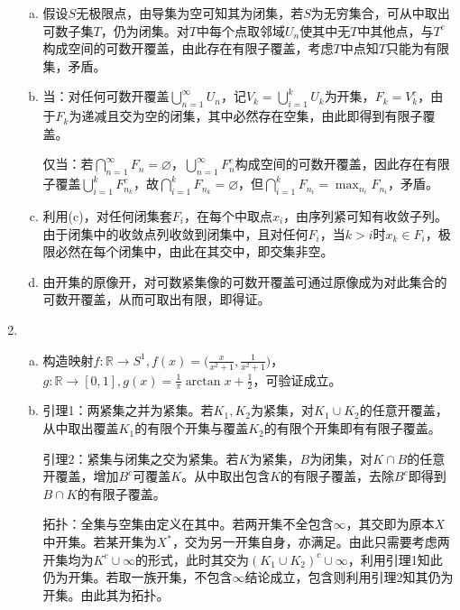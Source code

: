 \documentclass[a4paper,UTF8,fontset=windows]{ctexart}
\begin{document}
\begin{enumerate}[(1)]
\begin{enumerate}[(a)]
    \item
    假设$S$无极限点，由导集为空可知其为闭集，若$S$为无穷集合，可从中取出可数子集$T$，仍为闭集。对$T$中每个点取邻域$U_n$使其中无$T$中其他点，与$T^c$构成空间的可数开覆盖，由此存在有限子覆盖，考虑$T$中点知$T$只能为有限集，矛盾。
    
    \item
    当：对任何可数开覆盖$\bigcup_{n=1}^\infty U_n$，记$V_k=\bigcup_{i=1}^kU_k$为开集，$F_k=V_k^c$，由于$F_k$为递减且交为空的闭集，其中必然存在空集，由此即得到有限子覆盖。
    
    仅当：若$\bigcap_{n=1}^\infty F_n=\varnothing$，$\bigcup_{n=1}^\infty F_n^c$构成空间的可数开覆盖，因此存在有限子覆盖$\bigcup_{i=1}^kF_{n_k}^c$，故$\bigcap_{i=1}^kF_{n_k}=\varnothing$，但$\bigcap_{i=1}^kF_{n_i}=\max_{n_i}F_{n_i}$，矛盾。
    
    \item
    利用(c)，对任何闭集套$F_i$，在每个中取点$x_i$，由序列紧可知有收敛子列。由于闭集中的收敛点列收敛到闭集中，且对任何$F_i$，当$k>i$时$x_k\in F_i$，极限必然在每个闭集中，由此在其交中，即交集非空。
    
    \item
    由开集的原像开，对可数紧集像的可数开覆盖可通过原像成为对此集合的可数开覆盖，从而可取出有限，即得证。
    \end{enumerate}
    
    \item
    \begin{enumerate}[(a)]
    \item
    构造映射$f:\mathbb{R}\to S^1,f(x)=\big(\frac{x}{x^2+1},\frac{1}{x^2+1}\big)$，$g:\mathbb{R}\to[0,1],g(x)=\frac{1}{\pi}\arctan{x}+\frac{1}{2}$，可验证成立。
    
    \item
    引理1：两紧集之并为紧集。若$K_1,K_2$为紧集，对$K_1\cup K_2$的任意开覆盖，从中取出覆盖$K_1$的有限个开集与覆盖$K_2$的有限个开集即有有限子覆盖。
    
    引理2：紧集与闭集之交为紧集。若$K$为紧集，$B$为闭集，对$K\cap B$的任意开覆盖，增加$B^c$可覆盖$K$。从中取出包含$K$的有限子覆盖，去除$B^c$即得到$B\cap K$的有限子覆盖。
    
    拓扑：全集与空集由定义在其中。若两开集不全包含$\infty$，其交即为原本$X$中开集。若某开集为$X^*$，交为另一开集自身，亦满足。由此只需要考虑两开集均为$K^c\cup\infty$的形式，此时其交为$(K_1\cup K_2)^c\cup\infty$，利用引理1知此仍为开集。若取一族开集，不包含$\infty$结论成立，包含则利用引理2知其仍为开集。由此其为拓扑。
    

\end{enumerate}
\end{enumerate}
\end{document}
